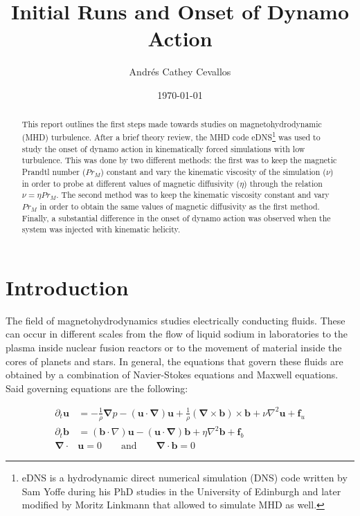 \documentclass[a4paper,12pt]{article}
\title{Initial Runs and Onset of Dynamo Action}
\author{Andr\'es Cathey Cevallos}
\date{\today}
\begin{document}
\maketitle

\begin{abstract}
 This report outlines the first steps made towards studies on magnetohydrodynamic (MHD) turbulence. After a brief theory review, the MHD code eDNS\footnote{eDNS is a hydrodynamic direct numerical simulation (DNS) code written by Sam Yoffe during his PhD studies in the University of Edinburgh and later modified by Moritz Linkmann that allowed to simulate MHD as well.} was used to study the onset of dynamo action in kinematically forced simulations with low turbulence. This was done by two different methods: the first was to keep the magnetic Prandtl number ($Pr_M$) constant and vary the kinematic viscosity of the simulation ($\nu$) in order to probe at different values of magnetic diffusivity ($\eta$) through the relation $\nu = \eta Pr_M$. The second method was to keep the kinematic viscosity constant and vary $Pr_M$ in order to obtain the same values of magnetic diffusivity as the first method. Finally, a substantial difference in the onset of dynamo action was observed when the system was injected with kinematic helicity.
\end{abstract}

\section{Introduction}

The field of magnetohydrodynamics studies electrically conducting fluids. These can occur in different scales from the flow of liquid sodium in laboratories to the plasma inside nuclear fusion reactors or to the movement of material inside the cores of planets and stars. In general, the equations that govern these fluids are obtained by a combination of Navier-Stokes equations and Maxwell equations. Said governing equations are the following:

\begin{align}
\partial_t \bm u &= - \frac{1}{\rho} \bm \nabla p - (\bm u \cdot \bm \nabla) \bm u + \frac{1}{\rho} (\bm \nabla \times \bm b) \times \bm b + \nu \nabla^2 \bm u + \bm f_u \label{eq1} \\
\partial_t \bm b &= (\bm b \cdot \nabla) \bm u - (\bm u \cdot \bm \nabla) \bm b + \eta \nabla^2 \bm b + \bm f_b \label{eq2} \\
\bm \nabla \cdot &\bm u = 0 \qquad \text{and} \qquad \bm \nabla \cdot \bm b = 0 \label{eq3}
\end{align}
\end{document}
